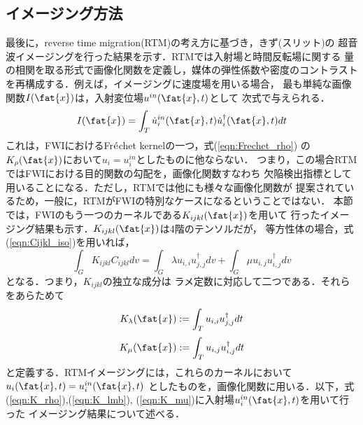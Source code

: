 \subsection{イメージング方法}
最後に，reverse time migration(RTM)の考え方に基づき，きず(スリット)の
超音波イメージングを行った結果を示す．RTMでは入射場と時間反転場に関する
量の相関を取る形式で画像化関数を定義し，媒体の弾性係数や密度のコントラスト
を再構成する．例えば，イメージングに速度場を用いる場合，
最も単純な画像関数$I(\fat{x})$は，入射変位場$u^{in}(\fat{x},t)$として
次式で与えられる．
\begin{equation}
	I(\fat{x})=\int_T \dot u^{in}_i(\fat{x},t) \dot u_i^{\dagger}(\fat{x},t)dt
	\label{eqn:Ix}
\end{equation}
これは，FWIにおけるFr$\acute{\rm e}$chet kernelの一つ，式(\ref{eqn:Frechet_rho})
の$K_\rho(\fat{x})$において$u_i=u_i^{in}$としたものに他ならない．
つまり，この場合RTMではFWIにおける目的関数の勾配を，画像化関数すなわち
欠陥検出指標として用いることになる．ただし，RTMでは他にも様々な画像化関数が
提案されているため，一般に，RTMがFWIの特別なケースになるということではない．
本節では，FWIのもう一つのカーネルである$K_{ijkl}(\fat{x})$を用いて
行ったイメージング結果も示す．$K_{ijkl}(\fat{x})$は4階のテンソルだが，
等方性体の場合，式(\ref{eqn:Cijkl_iso})を用いれば，
\begin{equation}
	\int_G K_{ijkl}C_{ijkl}dv
	=
	\int_G \lambda u_{i,i}u^{\dagger}_{j,j} dv
	+
	\int_G \mu u_{i,j}u^{\dagger}_{i,j} dv
	\label{eqn:}
\end{equation}
となる．つまり，$K_{ijkl}$の独立な成分は
ラメ定数に対応して二つである．それらをあらためて
\begin{equation}
	K_\lambda(\fat{x}):= \int_T u_{i,i}u^{\dagger}_{j,j} dt
	\label{eqn:K_lmb}
\end{equation}
\begin{equation}
	K_\mu(\fat{x}):= \int_T u_{i,j}u^{\dagger}_{i,j} dt
	\label{eqn:K_mu}
\end{equation}
と定義する．RTMイメージングには，これらのカーネルにおいて$u_i(\fat{x},t)=u_i^{in}(\fat{x},t)$
としたものを，画像化関数に用いる．以下，式(\ref{eqn:K_rho}),(\ref{eqn:K_lmb}),
(\ref{eqn:K_mu})に入射場$u_i^{in}(\fat{x},t)$を用いて行った
イメージング結果について述べる．
